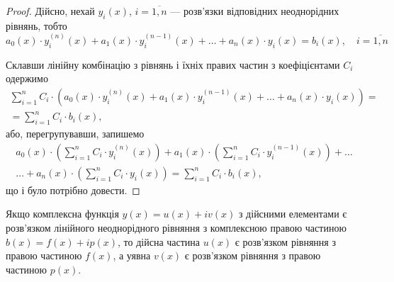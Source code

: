 \begin{proof}
	Дійсно, нехай $y_i(x)$, $i = \overline{1, n}$ --- розв'язки відповідних неоднорідних рівнянь, тобто
	\begin{equation*}
		a_0(x) \cdot y_i^{(n)}(x) + a_1(x) \cdot y_i^{(n - 1)}(x) + \ldots + a_n(x) \cdot y_i(x) = b_i(x), \quad i = \overline{1, n}
	\end{equation*}

	Склавши лінійну комбінацію з рівнянь і їхніх правих частин з коефіцієнтами $C_i$ одержимо
	\begin{multline*}
		\sum_{i = 1}^n C_i \cdot \left( a_0(x) \cdot y_i^{(n)}(x) + a_1(x) \cdot y_i^{(n - 1)}(x) + \ldots + a_n(x) \cdot y_i(x) \right) = \\ = \sum_{i = 1}^n C_i \cdot b_i(x),
	\end{multline*}
	або, перегрупувавши, запишемо
	\begin{multline*}
		a_0(x) \cdot \left( \sum_{i = 1}^n C_i \cdot y_i^{(n)}(x) \right) + a_1(x) \cdot \left( \sum_{i = 1}^n C_i \cdot y_i^{(n - 1)}(x)\right) + \ldots \\ \ldots + a_n(x) \cdot \left( \sum_{i = 1}^n C_i \cdot y_i(x) \right) = \sum_{i = 1}^n C_i \cdot b_i(x),
	\end{multline*}
	що і було потрібно довести.
\end{proof}

\begin{property}
	Якщо комплексна функція $y(x) = u(x) + i v(x)$ з дійсними елементами є розв'язком лінійного неоднорідного рівняння з комплексною правою частиною $b(x) = f(x) + i p(x)$, то дійсна частина $u(x)$ є розв'язком рівняння з правою частиною $f(x)$, а уявна $v(x)$ є розв'язком рівняння з правою частиною $p(x)$.
\end{property}

